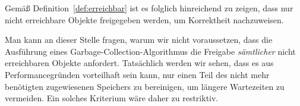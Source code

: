 Gemäß Definition~\ref{def:erreichbar} ist es folglich hinreichend zu zeigen, dass nur nicht erreichbare Objekte freigegeben werden, um Korrektheit nachzuweisen.

Man kann an dieser Stelle fragen, warum wir nicht voraussetzen, dass die Ausführung eines Garbage-Collection-Algorithmus die Freigabe \textit{sämtlicher} nicht erreichbaren Objekte anfordert.
Tatsächlich werden wir sehen, dass es aus Performancegründen vorteilhaft sein kann, nur einen Teil des nicht mehr benötigten zugewiesenen Speichers zu bereinigen, um längere Wartezeiten zu vermeiden.
Ein solches Kriterium wäre daher zu restriktiv.